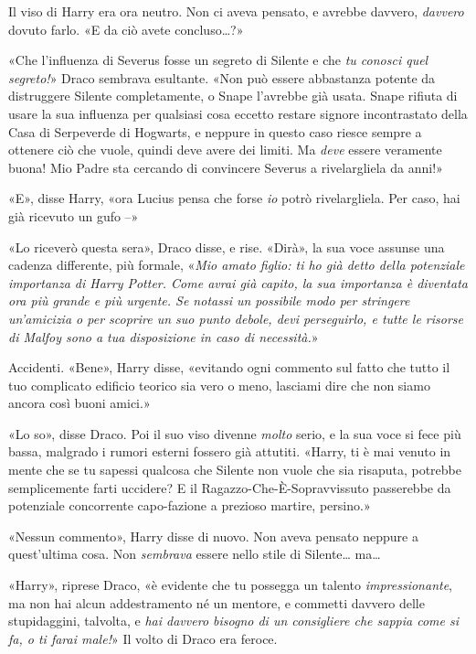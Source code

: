 Il viso di Harry era ora neutro. Non ci aveva pensato, e avrebbe davvero, \textit{davvero} dovuto farlo. «E da ciò avete concluso…?»

«Che l’influenza di Severus fosse un segreto di Silente e che \textit{tu conosci quel segreto!}» Draco sembrava esultante. «Non può essere abbastanza potente da distruggere Silente completamente, o Snape l’avrebbe già usata. Snape rifiuta di usare la sua influenza per qualsiasi cosa eccetto restare signore incontrastato della Casa di Serpeverde di Hogwarts, e neppure in questo caso riesce sempre a ottenere ciò che vuole, quindi deve avere dei limiti. Ma \textit{deve} essere veramente buona! Mio Padre sta cercando di convincere Severus a rivelargliela da anni!»

«E», disse Harry, «ora Lucius pensa che forse \textit{io} potrò rivelargliela. Per caso, hai già ricevuto un gufo –»

«Lo riceverò questa sera», Draco disse, e rise. «Dirà», la sua voce assunse una cadenza differente, più formale, «\textit{Mio amato figlio: ti ho già detto della potenziale importanza di Harry Potter. Come avrai già capito, la sua importanza è diventata ora più grande e più urgente. Se notassi un possibile modo per stringere un’amicizia o per scoprire un suo punto debole, devi perseguirlo, e tutte le risorse di Malfoy sono a tua disposizione in caso di necessità.}»

Accidenti. «Bene», Harry disse, «evitando ogni commento sul fatto che tutto il tuo complicato edificio teorico sia vero o meno, lasciami dire che non siamo ancora così buoni amici.»

«Lo so», disse Draco. Poi il suo viso divenne \textit{molto} serio, e la sua voce si fece più bassa, malgrado i rumori esterni fossero già attutiti. «Harry, ti è mai venuto in mente che se tu sapessi qualcosa che Silente non vuole che sia risaputa, potrebbe semplicemente farti uccidere? E il Ragazzo-Che-È-Sopravvissuto passerebbe da potenziale concorrente capo-fazione a prezioso martire, persino.»

«Nessun commento», Harry disse di nuovo. Non aveva pensato neppure a quest’ultima cosa. Non \textit{sembrava} essere nello stile di Silente… ma…

«Harry», riprese Draco, «è evidente che tu possegga un talento \textit{impressionante}, ma non hai alcun addestramento né un mentore, e commetti davvero delle stupidaggini, talvolta, e \textit{hai davvero bisogno di un consigliere che sappia come si fa, o ti farai male!}» Il volto di Draco era feroce.

